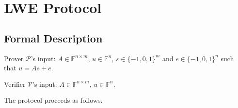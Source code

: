 









\section{LWE Protocol}

\subsection{Formal Description}

Prover $\mathcal{P}$'s input: $A \in \mathbb{F}^{n \times m}$, $u \in \mathbb{F}^{n}$, $s \in \{-1, 0, 1\}^{m}$ and $e \in \{-1, 0, 1\}^{n}$ such that $u = As + e$.

Verifier $\mathcal{V}$'s input: $A \in \mathbb{F}^{n \times m}$, $u \in \mathbb{F}^{n}$.

The protocol proceeds as follows.



